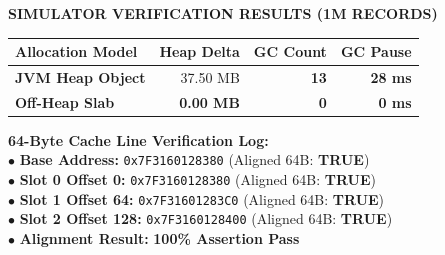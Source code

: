 \documentclass[12pt]{article}
\begin{document}
\begin{minipage}[t]{0.48\textwidth}
    \vspace{0pt}
    {\fontsize{9.5}{11}\selectfont\color{shidenmuted}\textbf{SIMULATOR VERIFICATION RESULTS (1M RECORDS)}\par}
    \vspace{3.5mm}
    
    \fontsize{9.5}{12.5}\selectfont
    \noindent
    \begin{tabular}{lrrr}
    \toprule
    \textbf{Allocation Model} & \textbf{Heap Delta} & \textbf{GC Count} & \textbf{GC Pause} \\
    \midrule
    \textbf{JVM Heap Object} & 37.50 MB & \color{shidenerror}\textbf{13} & \color{shidenerror}\textbf{28 ms} \\
    \textbf{Off-Heap Slab} & \color{shidensuccess}\textbf{0.00 MB} & \color{shidensuccess}\textbf{0} & \color{shidensuccess}\textbf{0 ms} \\
    \bottomrule
    \end{tabular}
    
    \vspace{3.5mm}
    \noindent\textcolor{shidenaccent}{\textbf{64-Byte Cache Line Verification Log:}}\\
    \textcolor{shidenpurple}{$\bullet$ \textbf{Base Address:}} \texttt{0x7F3160128380} (Aligned 64B: \textbf{TRUE})\\
    \textcolor{shidenpurple}{$\bullet$ \textbf{Slot 0 Offset 0:}} \texttt{0x7F3160128380} (Aligned 64B: \textbf{TRUE})\\
    \textcolor{shidenpurple}{$\bullet$ \textbf{Slot 1 Offset 64:}} \texttt{0x7F31601283C0} (Aligned 64B: \textbf{TRUE})\\
    \textcolor{shidenpurple}{$\bullet$ \textbf{Slot 2 Offset 128:}} \texttt{0x7F3160128400} (Aligned 64B: \textbf{TRUE})\\
    \textcolor{shidenpurple}{$\bullet$ \textbf{Alignment Result:}} \textbf{100\% Assertion Pass}
\end{minipage}
\clearpage
\end{document}
